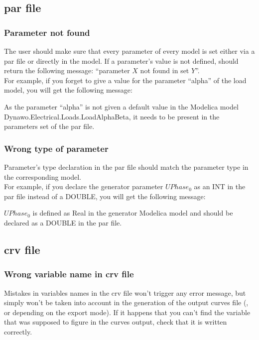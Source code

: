 \documentclass[a4paper, 12pt]{report}
\begin{document}


\subsection{par file}

\subsubsection{Parameter not found}

The user should make sure that every parameter of every model is set either via a par file or directly in the model. If a parameter's value is not defined, \Dynawo should return the following message: ``parameter $X$ not found in set $Y$''. \\

For example, if you forget to give a value for the parameter ``alpha'' of the load model, you will get the following message:


As the parameter ``alpha'' is not given a default value in the Modelica model Dynawo.Electrical.Loads.LoadAlphaBeta, it needs to be present in the parameters set of the par file.

\subsubsection{Wrong type of parameter}

Parameter's type declaration in the par file should match the parameter type in the corresponding model. \\

For example, if you declare the generator parameter $UPhase_0$ as an INT in the par file instead of a DOUBLE, you will get the following message:
\vspace{0.6cm} %


$UPhase_0$ is defined as Real in the generator Modelica model and should be declared as a DOUBLE in the par file.

\subsection{crv file}

\subsubsection{Wrong variable name in crv file}

Mistakes in variables names in the crv file won't trigger any error message, but simply won't be taken into account in the generation of the output curves file (,  or  depending on the export mode). If it happens that you can't find the variable that was supposed to figure in the curves output, check that it is written correctly.
\end{document}
